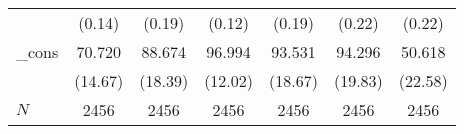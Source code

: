 {\begin{tabular}{l*{6}{c}}
            &                   (0.14)         &                   (0.19)         &                   (0.12)         &                   (0.19)         &                   (0.22)         &                   (0.22)         \\
\_cons      &                   70.720\sym{***}&                   88.674\sym{***}&                   96.994\sym{***}&                   93.531\sym{***}&                   94.296\sym{***}&                   50.618\sym{*}  \\
            &                  (14.67)         &                  (18.39)         &                  (12.02)         &                  (18.67)         &                  (19.83)         &                  (22.58)         \\
\hline
\(N\)       &                     2456         &                     2456         &                     2456         &                     2456         &                     2456         &                     2456         \\
\hline\hline
\end{tabular}
}
